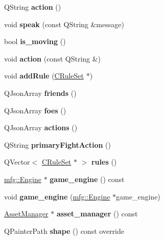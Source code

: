 \begin{DoxyCompactItemize}
Q\+String {\bfseries action} ()
\item 
\mbox{\label{class_actor_a5ac76fa61c5c3d16a89576d20accae57}} 
void {\bfseries speak} (const Q\+String \&message)
\item 
\mbox{\label{class_actor_a27108b4cb5241bcd4adbd0afb3e9632f}} 
bool {\bfseries is\+\_\+moving} ()
\item 
\mbox{\label{class_actor_abca365f0bc4f7c169f1fa59985820164}} 
void {\bfseries action} (const Q\+String \&)
\item 
\mbox{\label{class_actor_a5e95affed2e382b6ba1c61de2134362d}} 
void {\bfseries add\+Rule} (\hyperlink{class_c_rule_set}{C\+Rule\+Set} $\ast$)
\item 
\mbox{\label{class_actor_a716f5b635588ec9cb8d89879e4f1f81e}} 
Q\+Json\+Array {\bfseries friends} ()
\item 
\mbox{\label{class_actor_a963c28667c6a2fac64d975482ed571d7}} 
Q\+Json\+Array {\bfseries foes} ()
\item 
\mbox{\label{class_actor_a07d30fbeb6db8a0fd3d76ed309aaa27e}} 
Q\+Json\+Array {\bfseries actions} ()
\item 
\mbox{\label{class_actor_a33e69369909a1124c509df8730277f9a}} 
Q\+String {\bfseries primary\+Fight\+Action} ()
\item 
\mbox{\label{class_actor_ae5cd3908883f762b385b0425c47bebbf}} 
Q\+Vector$<$ \hyperlink{class_c_rule_set}{C\+Rule\+Set} $\ast$ $>$ {\bfseries rules} ()
\item 
\mbox{\label{class_actor_abfdaca3d60f8be25ad5d310fbded3fab}} 
\hyperlink{classmfg_1_1_engine}{mfg\+::\+Engine} $\ast$ {\bfseries game\+\_\+engine} () const
\item 
\mbox{\label{class_actor_a1ac165109ea83ae088f67213a9fe9500}} 
void {\bfseries game\+\_\+engine} (\hyperlink{classmfg_1_1_engine}{mfg\+::\+Engine} $\ast$game\+\_\+engine)
\item 
\mbox{\label{class_actor_acffb540df7518225c58da445d271fd86}} 
\hyperlink{class_asset_manager}{Asset\+Manager} $\ast$ {\bfseries asset\+\_\+manager} () const
\item 
\mbox{\label{class_actor_a1acf47e3cba338cf7affaf0116970236}} 
Q\+Painter\+Path {\bfseries shape} () const override
\end{DoxyCompactItemize}
